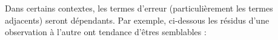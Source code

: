 \documentclass[french]{article}
\begin{document}
\begin{multicols*}{2}
\begin{center}
\end{center}

Dans certains contextes, les termes d'erreur (particulièrement les termes adjacents) seront dépendants. Par exemple, ci-dessous les résidus d'une observation à l'autre ont tendance d'êtres semblables :
\begin{center}
\begin{tikzpicture}[x=0.75pt,y=0.75pt,yscale=-1,xscale=1]


\end{tikzpicture}
\end{center}
\end{multicols*}
\end{document}
